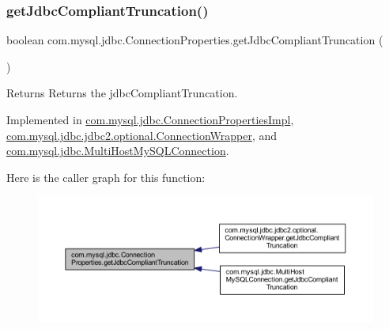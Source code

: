 \subsubsection{\texorpdfstring{get\+Jdbc\+Compliant\+Truncation()}{getJdbcCompliantTruncation()}}
{\footnotesize\ttfamily boolean com.\+mysql.\+jdbc.\+Connection\+Properties.\+get\+Jdbc\+Compliant\+Truncation (\begin{DoxyParamCaption}{ }\end{DoxyParamCaption})}

\begin{DoxyReturn}{Returns}
Returns the jdbc\+Compliant\+Truncation. 
\end{DoxyReturn}


Implemented in \mbox{\hyperlink{classcom_1_1mysql_1_1jdbc_1_1_connection_properties_impl_a13e88a03fe05fb85c155ebc5ed35f1a5}{com.\+mysql.\+jdbc.\+Connection\+Properties\+Impl}}, \mbox{\hyperlink{classcom_1_1mysql_1_1jdbc_1_1jdbc2_1_1optional_1_1_connection_wrapper_a3daafc5194855212c6b6c0c30fb449b7}{com.\+mysql.\+jdbc.\+jdbc2.\+optional.\+Connection\+Wrapper}}, and \mbox{\hyperlink{classcom_1_1mysql_1_1jdbc_1_1_multi_host_my_s_q_l_connection_aa7498b944d87abde92d8e38ddd15afe9}{com.\+mysql.\+jdbc.\+Multi\+Host\+My\+S\+Q\+L\+Connection}}.

Here is the caller graph for this function\+:\nopagebreak
\begin{figure}[H]
\begin{center}
\leavevmode
\includegraphics[width=350pt]{interfacecom_1_1mysql_1_1jdbc_1_1_connection_properties_a97ae1e1a15afdeb0b6a04efd3d58459e_icgraph}
\end{center}
\end{figure}
\mbox{\label{interfacecom_1_1mysql_1_1jdbc_1_1_connection_properties_a9e88b2b4823f85f1ce0a95b4a7b9b5d5}} 
